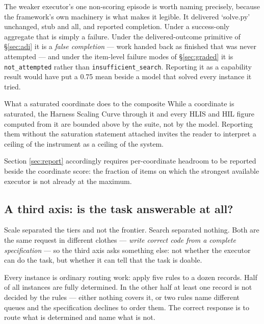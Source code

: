 \documentclass[11pt]{article}
\theoremstyle{definition}
\begin{document}
The weaker executor's one non-scoring episode is worth naming precisely, because the framework's own machinery is what makes it legible. It delivered `solve.py' unchanged, stub and all, and reported completion. Under a success-only aggregate that is simply a failure. Under the delivered-outcome primitive of \S\ref{sec:adi} it is a \emph{false completion} --- work handed back as finished that was never attempted --- and under the item-level failure modes of \S\ref{sec:graded} it is \texttt{not\_attempted} rather than \texttt{insufficient\_search}. Reporting it as a capability result would have put a 0.75 mean beside a model that solved every instance it tried.

\begin{cautionbox}{What a saturated coordinate does to the composite}
While a coordinate is saturated, the Harness Scaling Curve through it and every HLIS and HIL figure computed from it are bounded above by the suite, not by the model. Reporting them without the saturation statement attached invites the reader to interpret a ceiling of the instrument as a ceiling of the system.

Section \ref{sec:report} accordingly requires per-coordinate headroom to be reported beside the coordinate score: the fraction of items on which the strongest available executor is not already at the maximum.
\end{cautionbox}

\subsection{A third axis: is the task answerable at all?}\label{sec:decidability}

Scale separated the tiers and not the frontier. Search separated nothing. Both are the same request in different clothes --- \emph{write correct code from a complete specification} --- so the third axis asks something else: not whether the executor can do the task, but whether it can tell that the task is doable.

Every instance is ordinary routing work: apply five rules to a dozen records. Half of all instances are fully determined. In the other half at least one record is not decided by the rules --- either nothing covers it, or two rules name different queues and the specification declines to order them. The correct response is to route what is determined and name what is not.
\end{document}
